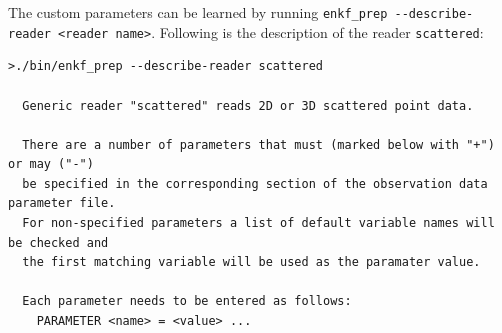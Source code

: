 \documentclass[11pt]{report}
\begin{document}
The custom parameters can be learned by running \verb|enkf_prep --describe-reader <reader name>|.
Following is the description of the reader \verb|scattered|:
\begin{Verbatim}
>./bin/enkf_prep --describe-reader scattered

  Generic reader "scattered" reads 2D or 3D scattered point data.

  There are a number of parameters that must (marked below with "+") or may ("-")
  be specified in the corresponding section of the observation data parameter file.
  For non-specified parameters a list of default variable names will be checked and
  the first matching variable will be used as the paramater value.

  Each parameter needs to be entered as follows:
    PARAMETER <name> = <value> ...


\end{Verbatim}
\end{document}
